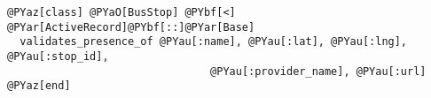 \begin{Verbatim}[commandchars=@\[\]]
@PYaz[class] @PYaO[BusStop] @PYbf[<] @PYar[ActiveRecord]@PYbf[::]@PYar[Base]
  validates_presence_of @PYau[:name], @PYau[:lat], @PYau[:lng], @PYau[:stop_id],
                                @PYau[:provider_name], @PYau[:url]
@PYaz[end]
\end{Verbatim}
